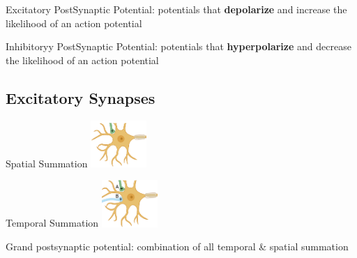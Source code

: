 \documentclass[11pt,fleqn]{book}
\begin{document}
\begin{descriptions}
    \item[Excitatory PostSynaptic Potential:] potentials that \textbf{depolarize} and increase the likelihood of an action potential
    \item[Inhibitoryy PostSynaptic Potential:] potentials that \textbf{hyperpolarize} and decrease the likelihood of an action potential
\end{descriptions}

\subsection{Excitatory Synapses}
\begin{descriptions}
    \item[Spatial Summation] \includegraphics[width=60pt]{Pictures/Screenshot 2024-03-06 175455.png} 
    \item[Temporal Summation] \includegraphics[width=60pt]{Pictures/Screenshot 2024-03-06 175510.png} 
    \item[Grand postsynaptic potential:] combination of all temporal \& spatial summation 
\end{descriptions}
\end{document}
